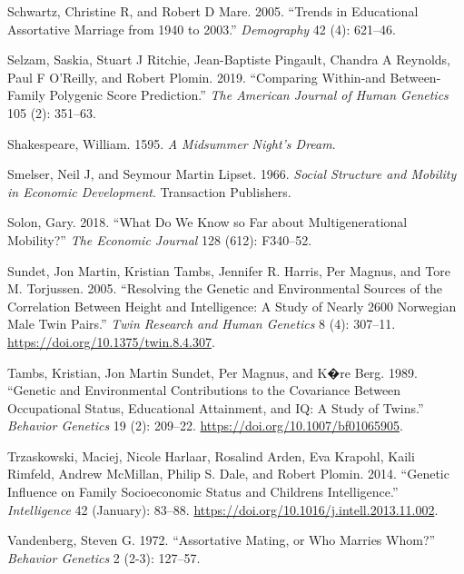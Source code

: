 \documentclass[
]{article}
\newlength{\cslhangindent}
\newlength{\cslentryspacingunit} %
\newenvironment{CSLReferences}[2] %
 {%
  \setlength{\parindent}{0pt}
  \ifodd #1
  \let\oldpar\par
  \def\par{\hangindent=\cslhangindent\oldpar}
  \fi
  \setlength{\parskip}{#2\cslentryspacingunit}
 }%
 {}
\theoremstyle{definition}
\theoremstyle{definition}
\theoremstyle{definition}
\theoremstyle{definition}
\theoremstyle{remark}
\begin{document}
\begin{CSLReferences}{1}{0}
\leavevmode{}%
Schwartz, Christine R, and Robert D Mare. 2005. {``Trends in Educational Assortative Marriage from 1940 to 2003.''} \emph{Demography} 42 (4): 621--46.

\leavevmode{}%
Selzam, Saskia, Stuart J Ritchie, Jean-Baptiste Pingault, Chandra A Reynolds, Paul F O'Reilly, and Robert Plomin. 2019. {``Comparing Within-and Between-Family Polygenic Score Prediction.''} \emph{The American Journal of Human Genetics} 105 (2): 351--63.

\leavevmode{}%
Shakespeare, William. 1595. \emph{A Midsummer Night's Dream}.

\leavevmode{}%
Smelser, Neil J, and Seymour Martin Lipset. 1966. \emph{Social Structure and Mobility in Economic Development}. Transaction Publishers.

\leavevmode{}%
Solon, Gary. 2018. {``What Do We Know so Far about Multigenerational Mobility?''} \emph{The Economic Journal} 128 (612): F340--52.

\leavevmode{}%
Sundet, Jon Martin, Kristian Tambs, Jennifer R. Harris, Per Magnus, and Tore M. Torjussen. 2005. {``Resolving the Genetic and Environmental Sources of the Correlation Between Height and Intelligence: A Study of Nearly 2600 Norwegian Male Twin Pairs.''} \emph{Twin Research and Human Genetics} 8 (4): 307--11. \url{https://doi.org/10.1375/twin.8.4.307}.

\leavevmode{}%
Tambs, Kristian, Jon Martin Sundet, Per Magnus, and K�re Berg. 1989. {``Genetic and Environmental Contributions to the Covariance Between Occupational Status, Educational Attainment, and {IQ}: A Study of Twins.''} \emph{Behavior Genetics} 19 (2): 209--22. \url{https://doi.org/10.1007/bf01065905}.

\leavevmode{}%
Trzaskowski, Maciej, Nicole Harlaar, Rosalind Arden, Eva Krapohl, Kaili Rimfeld, Andrew McMillan, Philip S. Dale, and Robert Plomin. 2014. {``Genetic Influence on Family Socioeconomic Status and Children{\textquotesingle}s Intelligence.''} \emph{Intelligence} 42 (January): 83--88. \url{https://doi.org/10.1016/j.intell.2013.11.002}.

\leavevmode{}%
Vandenberg, Steven G. 1972. {``Assortative Mating, or Who Marries Whom?''} \emph{Behavior Genetics} 2 (2-3): 127--57.


\end{CSLReferences}
\end{document}
